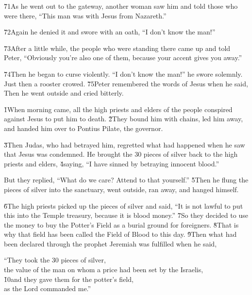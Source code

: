 \v{71}As he went out to the gateway, another woman saw him and told those who were there, ``This man was with Jesus from Nazareth.''

\v{72}Again he denied it and swore with an oath, ``I don't know the man!''

\v{73}After a little while, the people who were standing there came up and told Peter, ``Obviously you're also one of them, because your accent gives you away.''

\v{74}Then he began to curse violently. ``I don't know the man!'' he swore solemnly. Just then a rooster crowed. \v{75}Peter remembered the words of Jesus when he said,  Then he went outside and cried bitterly.

\v{1}When morning came, all the high priests and elders of the people conspired against Jesus to put him to death. \v{2}They bound him with chains, led him away, and handed him over to Pontius Pilate, the governor.

\v{3}Then Judas, who had betrayed him, regretted what had happened when he saw that Jesus was condemned. He brought the 30 pieces of silver back to the high priests and elders, \v{4}saying, ``I have sinned by betraying innocent blood.''

But they replied, ``What do we care? Attend to that yourself.'' \v{5}Then he flung the pieces of silver into the sanctuary, went outside, ran away, and hanged himself.

\v{6}The high priests picked up the pieces of silver and said, ``It is not lawful to put this into the Temple treasury, because it is blood money.'' \v{7}So they decided to use the money to buy the Potter's Field as a burial ground for foreigners. \v{8}That is why that field has been called the Field of Blood to this day. \v{9}Then what had been declared through the prophet Jeremiah was fulfilled when he said,

\begin{poetry}
\poeml ``They took the 30 pieces of silver, \\
\poemll    the value of the man on whom a price had been set by the Israelis, \\
\poeml \v{10}and they gave them for the potter's field, \\
\poemll    as the Lord commanded me.''
\end{poetry}

